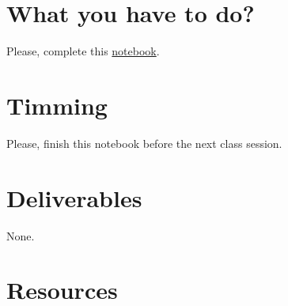 \section{What you have to do?}
  
Please, complete this
\href{https://github.com/Sistemas-Multimedia/Sistemas-Multimedia.github.io/blob/master/study_guide/MDWT/MDWT.ipynb}{notebook}.

\section{Timming}

Please, finish this notebook before the next class session.

\section{Deliverables}

None.

\section{Resources}


